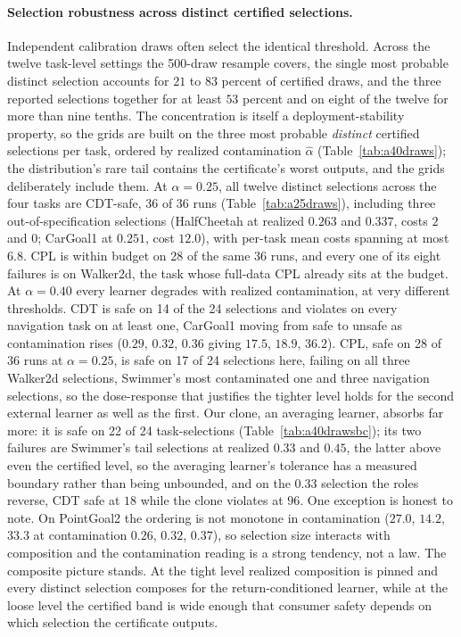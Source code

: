 \documentclass{article} %
\begin{document}
\paragraph{Selection robustness across distinct certified selections.} Independent calibration draws often select the identical threshold. Across the twelve task-level settings the 500-draw resample covers, the single most probable distinct selection accounts for $21$ to $83$ percent of certified draws, and the three reported selections together for at least $53$ percent and on eight of the twelve for more than nine tenths. The concentration is itself a deployment-stability property, so the grids are built on the three most probable \emph{distinct} certified selections per task, ordered by realized contamination $\hat\alpha$ (Table~\ref{tab:a40draws}); the distribution's rare tail contains the certificate's worst outputs, and the grids deliberately include them. At $\alpha = 0.25$, all twelve distinct selections across the four tasks are CDT-safe, 36 of 36 runs (Table~\ref{tab:a25draws}), including three out-of-specification selections (HalfCheetah at realized $0.263$ and $0.337$, costs $2$ and $0$; CarGoal1 at $0.251$, cost $12.0$), with per-task mean costs spanning at most $6.8$. CPL is within budget on 28 of the same 36 runs, and every one of its eight failures is on Walker2d, the task whose full-data CPL already sits at the budget. At $\alpha = 0.40$ every learner degrades with realized contamination, at very different thresholds. CDT is safe on 14 of the 24 selections and violates on every navigation task on at least one, CarGoal1 moving from safe to unsafe as contamination rises ($0.29$, $0.32$, $0.36$ giving $17.5$, $18.9$, $36.2$). CPL, safe on 28 of 36 runs at $\alpha = 0.25$, is safe on 17 of 24 selections here, failing on all three Walker2d selections, Swimmer's most contaminated one and three navigation selections, so the dose-response that justifies the tighter level holds for the second external learner as well as the first. Our clone, an averaging learner, absorbs far more: it is safe on 22 of 24 task-selections (Table~\ref{tab:a40drawsbc}); its two failures are Swimmer's tail selections at realized $0.33$ and $0.45$, the latter above even the certified level, so the averaging learner's tolerance has a measured boundary rather than being unbounded, and on the $0.33$ selection the roles reverse, CDT safe at $18$ while the clone violates at $96$. One exception is honest to note. On PointGoal2 the ordering is not monotone in contamination ($27.0$, $14.2$, $33.3$ at contamination $0.26$, $0.32$, $0.37$), so selection size interacts with composition and the contamination reading is a strong tendency, not a law. The composite picture stands. At the tight level realized composition is pinned and every distinct selection composes for the return-conditioned learner, while at the loose level the certified band is wide enough that consumer safety depends on which selection the certificate outputs.
\end{document}
